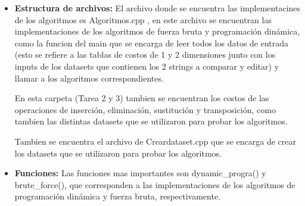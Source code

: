 \begin{itemize}
    \item \textbf{Estructura de archivos:} El archivo donde se encuentra las implementacines de los algoritmos es
    Algoritmos.cpp , en este archivo se encuentran las implementaciones de los algoritmos de fuerza bruta y programación dinámica,
    como la funcion del main que se encarga de leer todos los datos de entrada (esto se refiere a las tablas de costos de 1 y 2 
    dimensiones junto con los inputs de los datasets que contienen los 2 strings a comparar y editar) y llamar a los algoritmos 
    correspondientes.


    En esta carpeta (Tarea 2 y 3) tambien se encuentran los costos de las operaciones de inserción, eliminación, 
    sustitución y transposición, como tambien las distintas datasets que se utilizaron para probar los algoritmos.


    Tambien se encuentra el archivo de Creardataset.cpp que se encarga de crear los datasets que se utilizaron para probar
    los algoritmos.
    \item \textbf{Funciones:} Las funciones mas importantes son dynamic\_progra() y brute\_force(), que corresponden a 
    las implementaciones de los algoritmos de programación dinámica y fuerza bruta, respectivamente.
\end{itemize}
